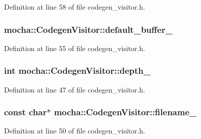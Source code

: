 Definition at line 58 of file codegen\_\-visitor.h.

\hypertarget{classmocha_1_1_codegen_visitor_a7570febb0ccff0a7c6895031d8e4f124}{
\subsubsection[{default\_\-buffer\_\-}]{ {\bf mocha::CodegenVisitor::default\_\-buffer\_\-}}}
\label{classmocha_1_1_codegen_visitor_a7570febb0ccff0a7c6895031d8e4f124}


Definition at line 55 of file codegen\_\-visitor.h.

\hypertarget{classmocha_1_1_codegen_visitor_addd36abf7937731e4890f02aee09f35c}{
\subsubsection[{depth\_\-}]{\setlength{\rightskip}{0pt plus 5cm}int {\bf mocha::CodegenVisitor::depth\_\-}}}
\label{classmocha_1_1_codegen_visitor_addd36abf7937731e4890f02aee09f35c}


Definition at line 47 of file codegen\_\-visitor.h.

\hypertarget{classmocha_1_1_codegen_visitor_aab8ca0550a471810ff7caa360fbd26b4}{
\subsubsection[{filename\_\-}]{\setlength{\rightskip}{0pt plus 5cm}const char$\ast$ {\bf mocha::CodegenVisitor::filename\_\-}}}
\label{classmocha_1_1_codegen_visitor_aab8ca0550a471810ff7caa360fbd26b4}


Definition at line 50 of file codegen\_\-visitor.h.

